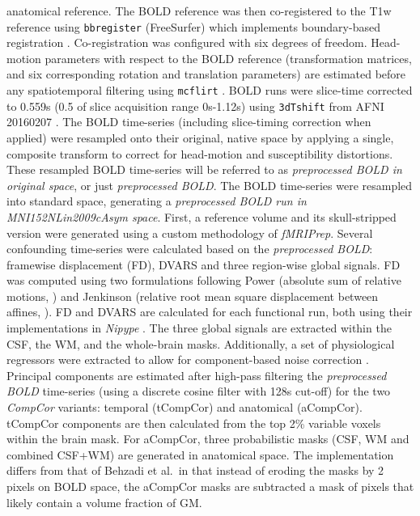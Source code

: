 \documentclass[]{article}
\begin{document}
\begin{description}
anatomical reference. The BOLD reference was then co-registered to the
T1w reference using \texttt{bbregister} (FreeSurfer) which implements
boundary-based registration \citep{bbr}. Co-registration was configured
with six degrees of freedom. Head-motion parameters with respect to the
BOLD reference (transformation matrices, and six corresponding rotation
and translation parameters) are estimated before any spatiotemporal
filtering using \texttt{mcflirt} \citep[FSL 5.0.9,][]{mcflirt}. BOLD
runs were slice-time corrected to 0.559s (0.5 of slice acquisition range
0s-1.12s) using \texttt{3dTshift} from AFNI 20160207
\citep[RRID:SCR\_005927]{afni}. The BOLD time-series (including
slice-timing correction when applied) were resampled onto their
original, native space by applying a single, composite transform to
correct for head-motion and susceptibility distortions. These resampled
BOLD time-series will be referred to as \emph{preprocessed BOLD in
original space}, or just \emph{preprocessed BOLD}. The BOLD time-series
were resampled into standard space, generating a \emph{preprocessed BOLD
run in MNI152NLin2009cAsym space}. First, a reference volume and its
skull-stripped version were generated using a custom methodology of
\emph{fMRIPrep}. Several confounding time-series were calculated based
on the \emph{preprocessed BOLD}: framewise displacement (FD), DVARS and
three region-wise global signals. FD was computed using two formulations
following Power (absolute sum of relative motions,
\citet{power_fd_dvars}) and Jenkinson (relative root mean square
displacement between affines, \citet{mcflirt}). FD and DVARS are
calculated for each functional run, both using their implementations in
\emph{Nipype} \citep[following the definitions by][]{power_fd_dvars}.
The three global signals are extracted within the CSF, the WM, and the
whole-brain masks. Additionally, a set of physiological regressors were
extracted to allow for component-based noise correction
\citep[\emph{CompCor},][]{compcor}. Principal components are estimated
after high-pass filtering the \emph{preprocessed BOLD} time-series
(using a discrete cosine filter with 128s cut-off) for the two
\emph{CompCor} variants: temporal (tCompCor) and anatomical (aCompCor).
tCompCor components are then calculated from the top 2\% variable voxels
within the brain mask. For aCompCor, three probabilistic masks (CSF, WM
and combined CSF+WM) are generated in anatomical space. The
implementation differs from that of Behzadi et al.~in that instead of
eroding the masks by 2 pixels on BOLD space, the aCompCor masks are
subtracted a mask of pixels that likely contain a volume fraction of GM.

\end{description}
\end{document}
